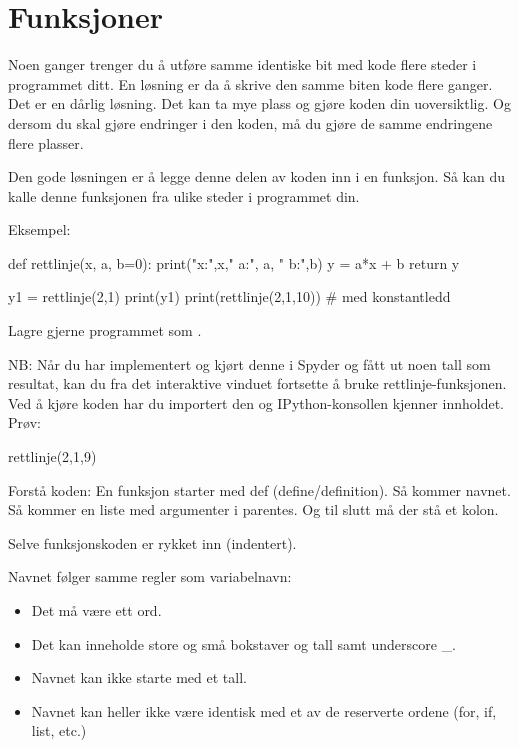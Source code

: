 \section{Funksjoner}

Noen ganger trenger du å utføre samme identiske bit med kode flere steder i programmet ditt. En løsning er da å skrive den samme biten kode flere ganger. Det er en dårlig løsning. Det kan ta mye plass og gjøre koden din uoversiktlig. Og dersom du skal gjøre endringer i den koden, må du gjøre de samme endringene flere plasser. 

Den gode løsningen er å legge denne delen av koden inn i en funksjon. Så kan du kalle denne funksjonen fra ulike steder i programmet din.

Eksempel:
\begin{usncodebox}
def rettlinje(x, a, b=0):
    print("x:",x,"  a:", a, "  b:",b)
    y = a*x + b
    return y
    
y1 = rettlinje(2,1)
print(y1)
print(rettlinje(2,1,10))   # med konstantledd
\end{usncodebox}

Lagre gjerne programmet som .

NB: Når du har implementert og kjørt denne i Spyder og fått ut noen tall som resultat, kan du fra det interaktive vinduet fortsette å bruke rettlinje-funksjonen. Ved å kjøre koden har du importert den og IPython-konsollen kjenner innholdet. 
Prøv:

\begin{usncodebox}
rettlinje(2,1,9) 
\end{usncodebox}

Forstå koden:
En funksjon starter med def (define/definition). Så kommer navnet. Så kommer en liste med argumenter i parentes. Og til slutt må der stå et kolon. 

Selve funksjonskoden er rykket inn (indentert).

Navnet følger samme regler som variabelnavn:
\begin{itemize}
\item Det må være ett ord.
\item Det kan inneholde store og små bokstaver og tall samt underscore \_.
\item Navnet kan ikke starte med et tall.
\item Navnet kan heller ikke være identisk med et av de reserverte ordene (for, if, list, etc.) 
\end{itemize}

